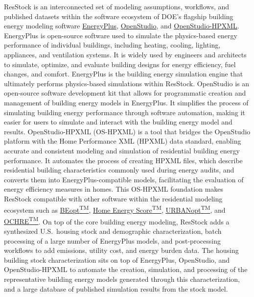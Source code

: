 ResStock is an interconnected set of modeling assumptions, workflows, and published datasets within the software ecosystem of DOE's flagship building energy modeling software \href{https://energyplus.net/}{EnergyPlus}, \href{https://openstudio.net/}{OpenStudio}, and \href{https://openstudio-hpxml.readthedocs.io/en/v1.10.0/}{OpenStudio-HPXML}. EnergyPlus is open-source software used to simulate the physics-based energy performance of individual buildings, including heating, cooling, lighting, appliances, and ventilation systems. It is widely used by engineers and architects to simulate, optimize, and evaluate building designs for energy efficiency, fuel changes, and comfort. EnergyPlus is the building energy simulation engine that ultimately performs physics-based simulations within ResStock. OpenStudio is an open-source software development kit that allows for programmatic creation and management of building energy models in EnergyPlus. It simplifies the process of simulating building energy performance through software automation, making it easier for users to simulate and interact with the building energy model and results. OpenStudio-HPXML (OS-HPXML) is a tool that bridges the OpenStudio platform with the Home Performance XML (HPXML) data standard, enabling accurate and consistent modeling and simulation of residential building energy performance. It automates the process of creating HPXML files, which describe residential building characteristics commonly used during energy audits, and converts them into EnergyPlus-compatible models, facilitating the evaluation of energy efficiency measures in homes. This OS-HPXML foundation makes ResStock compatible with other software within the residential modeling ecosystem such as \href{https://www.nrel.gov/buildings/beopt.html}{BEopt\textsuperscript{TM}}, \href{https://www.energy.gov/eere/buildings/articles/home-energy-score}{Home Energy Score\textsuperscript{TM}}, \href{https://docs.urbanopt.net/}{URBANopt\textsuperscript{TM}}, and \href{https://github.com/NREL/OCHRE}{OCHRE\textsuperscript{TM}}. On top of the core building energy modeling, ResStock adds a synthesized U.S.~housing stock and demographic characterization, batch processing of a large number of EnergyPlus models, and post-processing workflows to add emissions, utility cost, and energy burden data. The housing building stock characterization sits on top of EnergyPlus, OpenStudio, and OpenStudio-HPXML to automate the creation, simulation, and processing of the representative building energy models generated through this characterization, and a large database of published simulation results from the stock model. 

